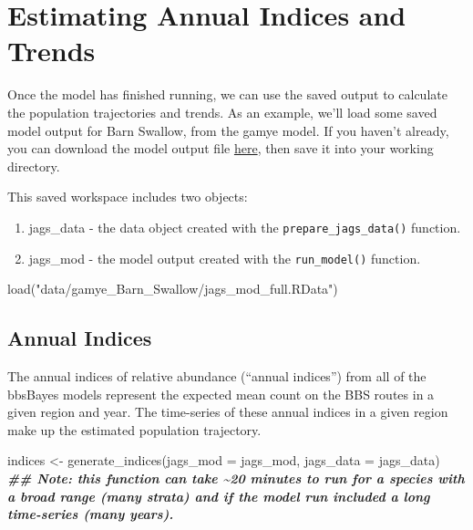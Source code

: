 \documentclass[
]{book}
\newenvironment{Shaded}{\begin{snugshade}}{\end{snugshade}}
\newcommand{\AttributeTok}[1]{\textcolor[rgb]{0.77,0.63,0.00}{#1}}
\newcommand{\DocumentationTok}[1]{\textcolor[rgb]{0.56,0.35,0.01}{\textbf{\textit{#1}}}}
\newcommand{\FunctionTok}[1]{\textcolor[rgb]{0.00,0.00,0.00}{#1}}
\newcommand{\NormalTok}[1]{#1}
\newcommand{\OtherTok}[1]{\textcolor[rgb]{0.56,0.35,0.01}{#1}}
\newcommand{\StringTok}[1]{\textcolor[rgb]{0.31,0.60,0.02}{#1}}
\begin{document}
\hypertarget{IndicesTrends}{%
\chapter{Estimating Annual Indices and Trends}\label{IndicesTrends}}

Once the model has finished running, we can use the saved output to calculate the population trajectories and trends. As an example, we'll load some saved model output for Barn Swallow, from the gamye model. If you haven't already, you can download the model output file \href{https://drive.google.com/drive/folders/1ar7nUNI3GXm1A_Kcoc2cAUQQ7ZV37wC6?usp=sharing}{here}, then save it into your working directory.

This saved workspace includes two objects:

\begin{enumerate}
\def\labelenumi{\arabic{enumi}.}
\item
  jags\_data - the data object created with the \texttt{prepare\_jags\_data()} function.
\item
  jags\_mod - the model output created with the \texttt{run\_model()} function.
\end{enumerate}

\begin{Shaded}
\begin{Highlighting}[]
\FunctionTok{load}\NormalTok{(}\StringTok{"data/gamye\_Barn\_Swallow/jags\_mod\_full.RData"}\NormalTok{)}
\end{Highlighting}
\end{Shaded}

\hypertarget{annual-indices}{%
\section{Annual Indices}\label{annual-indices}}

The annual indices of relative abundance (``annual indices'') from all of the bbsBayes models represent the expected mean count on the BBS routes in a given region and year. The time-series of these annual indices in a given region make up the estimated population trajectory.

\begin{Shaded}
\begin{Highlighting}[]
\NormalTok{indices }\OtherTok{\textless{}{-}} \FunctionTok{generate\_indices}\NormalTok{(}\AttributeTok{jags\_mod =}\NormalTok{ jags\_mod,}
                            \AttributeTok{jags\_data =}\NormalTok{ jags\_data)}
\DocumentationTok{\#\# Note: this function can take \textasciitilde{}20 minutes to run for a species with a broad range (many strata) and if the model run included a long time{-}series (many years).}
\end{Highlighting}
\end{Shaded}
\end{document}
